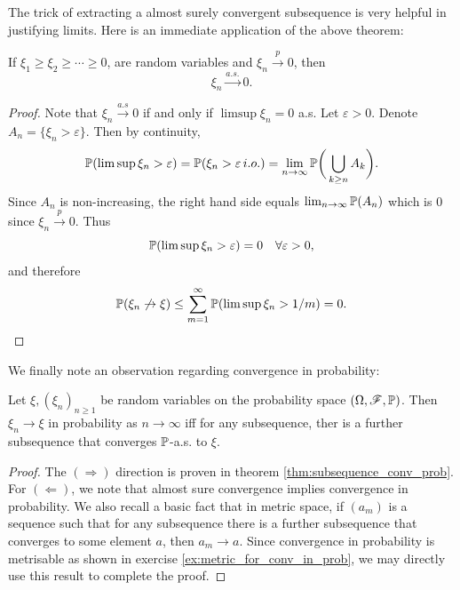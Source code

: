 The trick of extracting a almost surely convergent subsequence is very helpful in justifying limits. Here is an immediate application of the above theorem:
\begin{corollary}
If $\xi_1 \ge \xi_2 \ge \cdots \ge 0$, are random variables and $\xi_n \xrightarrow{p} 0$, then
\begin{equation*}
    \xi_n \xrightarrow{a.s.} 0.
\end{equation*}
\end{corollary}

\begin{proof}
Note that $\xi_n \xrightarrow{a.s} 0 $ if and only if $\limsup \xi_n = 0$ a.s. Let $\varepsilon > 0$. Denote $A_n = \{\xi_n > \varepsilon \}$. Then by continuity,
\begin{equation*}
    \mathbb{P}(\limsup \xi_n > \varepsilon) = \mathbb{P}(\xi_n > \varepsilon \, i.o.) = \lim_{n \to \infty} \mathbb{P}\bigg(\bigcup_{k \ge n} A_k\bigg).
\end{equation*}
Since $A_n$ is non-increasing, the right hand side equals $\lim_{n \to \infty} \mathbb{P}(A_n)$ which is $0$ since $\xi_n \xrightarrow{p} 0$. Thus 
\begin{equation*}
    \mathbb{P}(\limsup \xi_n > \varepsilon) = 0 \quad \forall \varepsilon > 0,
\end{equation*}
and therefore
\begin{equation*}
    \mathbb{P}(\xi_n \not \to \xi) \le \sum_{m=1}^\infty \mathbb{P}(\limsup \xi_n > 1/m) = 0.
\end{equation*}
\end{proof}

\begin{unexaminable}
We finally note an observation regarding convergence in probability:
\begin{corollary}
Let $\xi, (\xi_n)_{n\geq 1}$ be random variables on the probability space $(\Omega,\mathcal{F},\mathbb{P})$. Then $\xi_n \to \xi$ in probability as $n \to \infty$ iff for any subsequence, ther is a further subsequence that converges $\mathbb{P}$-a.s. to $\xi$.
\end{corollary}
\begin{proof}
The $(\Rightarrow)$ direction is proven in theorem \ref{thm:subsequence_conv_prob}. For $(\Leftarrow)$, we note that almost sure convergence implies convergence in probability. We also recall a basic fact that in metric space, if $(a_m)$ is a sequence such that for any subsequence there is a further subsequence that converges to some element $a$, then $a_m \to a$. Since convergence in probability is metrisable as shown in exercise \ref{ex:metric_for_conv_in_prob}, we may directly use this result to complete the proof.
\end{proof}
\end{unexaminable}

